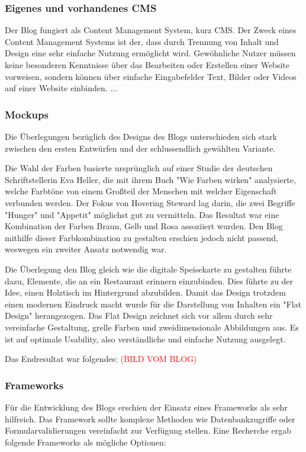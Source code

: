     \subsubsection{Eigenes und vorhandenes CMS}
    Der Blog fungiert als Content Management System, kurz CMS. Der Zweck eines
    Content Management Systems ist der, dass durch Trennung von Inhalt und Design eine
    sehr einfache Nutzung ermöglicht wird. Gewöhnliche Nutzer müssen keine besonderen
    Kenntnisse über das Bearbeiten oder Erstellen einer Website vorweisen, sondern
    können über einfache Eingabefelder Text, Bilder oder Videos auf einer Website einbinden.
    ...

    \subsubsection{Mockups}
    Die Überlegungen bezüglich des Designs des Blogs unterschieden sich stark zwischen den ersten
    Entwürfen und der schlussendlich gewählten Variante.

    Die Wahl der Farben basierte ursprünglich auf einer Studie der deutschen Schriftstellerin Eva Heller,
    die mit ihrem Buch {"Wie Farben wirken"\cite{WieFarbenWirken}} analysierte, welche Farbtöne von einem Großteil der Menschen
    mit welcher Eigenschaft verbunden werden. Der Fokus von Hovering Steward lag darin, die zwei Begriffe "Hunger"
    und "Appetit" möglichst gut zu vermitteln. Das Resultat war eine Kombination der Farben Braun, Gelb und Rosa
    assoziiert wurden. Den Blog mithilfe dieser Farbkombination zu gestalten erschien jedoch nicht passend, weswegen
    ein zweiter Ansatz notwendig war.

    Die Überlegung den Blog gleich wie die digitale Speisekarte zu gestalten führte dazu, Elemente, die an ein Restaurant
    erinnern einzubinden. Dies führte zu der Idee, einen Holztisch im Hintergrund abzubilden.
    Damit das Design trotzdem einen modernen Eindruck macht wurde für die Darstellung von Inhalten ein {"Flat Design"\cite{FlatDesign}}
    herangezogen. Das Flat Design zeichnet sich vor allem durch sehr vereinfache Gestaltung, grelle Farben und zweidimensionale Abbildungen aus.
    Es ist auf optimale Usability, also verständliche und einfache Nutzung ausgelegt.

    Das Endresultat war folgendes:
    \textcolor{red}{(BILD VOM BLOG)}

    \subsubsection{Frameworks}
    Für die Entwicklung des Blogs erschien der Einsatz eines Frameworks als sehr hilfreich. Das Framework sollte komplexe Methoden wie
    Datenbankzugriffe oder Formularvalidierungen vereinfacht zur Verfügung stellen. Eine Recherche ergab folgende Frameworks als mögliche
    Optionen:

